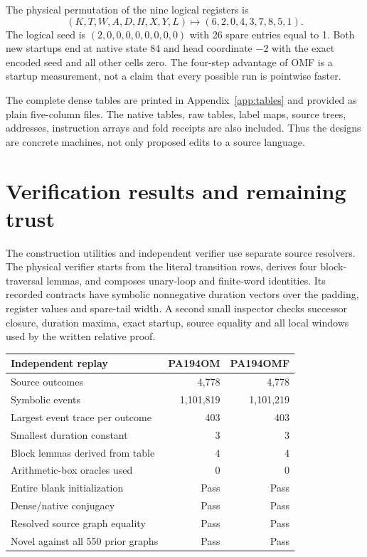 \documentclass[11pt,a4paper]{article}
\begin{document}
The physical permutation of the nine logical registers is
\[
       (K,T,W,A,D,H,X,Y,L)\longmapsto(6,2,0,4,3,7,8,5,1).
\]
The logical seed is $(2,0,0,0,0,0,0,0,0)$ with 26 spare entries equal to 1.
Both new startups end at native state 84 and head coordinate $-2$ with
the exact encoded seed and all other cells zero. The four-step advantage
of OMF is a startup measurement, not a claim that every possible run is
pointwise faster.

The complete dense tables are printed in Appendix~\ref{app:tables} and
provided as plain five-column files. The native tables, raw tables, label
maps, source trees, addresses, instruction arrays and fold receipts are
also included. Thus the designs are concrete machines, not only proposed
edits to a source language.



\section{Verification results and remaining trust}

The construction utilities and independent verifier use separate source
resolvers. The physical verifier starts from the literal transition rows,
derives four block-traversal lemmas, and composes unary-loop and finite-word
identities. Its recorded contracts have symbolic nonnegative duration
vectors over the padding, register values and spare-tail width. A second
small inspector checks successor closure, duration maxima, exact startup,
source equality and all local windows used by the written relative proof.

\begin{center}
\begin{tabular}{lrr}
\toprule
Independent replay & PA194OM & PA194OMF\\\midrule
Source outcomes &4,778&4,778\\
Symbolic events &1,101,819&1,101,219\\
Largest event trace per outcome &403&403\\
Smallest duration constant &3&3\\
Block lemmas derived from table &4&4\\
Arithmetic-box oracles used &0&0\\
Entire blank initialization &Pass&Pass\\
Dense/native conjugacy &Pass&Pass\\
Resolved source graph equality &Pass&Pass\\
Novel against all 550 prior graphs &Pass&Pass\\
\bottomrule
\end{tabular}
\end{center}
\end{document}
